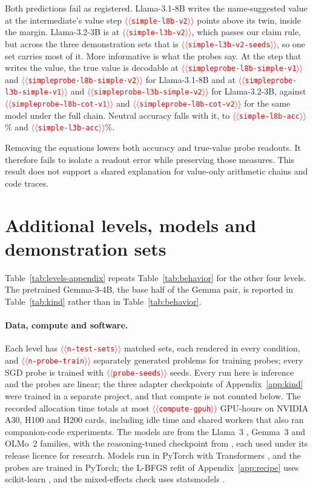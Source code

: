 \documentclass[11pt]{article}
\providecommand{\NUM}[1]{\textcolor{red}{$\langle\langle$\texttt{#1}$\rangle\rangle$}}
\begin{document}
Both predictions fail as registered. Llama-3.1-8B writes the name-suggested value at the intermediate's value
step \NUM{simple-l8b-v2} points above its twin, inside the margin. Llama-3.2-3B is at
\NUM{simple-l3b-v2}, which passes our claim rule, but across the three demonstration sets that
is \NUM{simple-l3b-v2-seeds}, so one set carries most of it. More informative is what the probes say. At
the step that writes the value, the true value is decodable at \NUM{simpleprobe-l8b-simple-v1}
and \NUM{simpleprobe-l8b-simple-v2} for Llama-3.1-8B and at
\NUM{simpleprobe-l3b-simple-v1} and \NUM{simpleprobe-l3b-simple-v2} for Llama-3.2-3B, against
\NUM{simpleprobe-l8b-cot-v1} and \NUM{simpleprobe-l8b-cot-v2} for the same model under the full
chain. Neutral accuracy falls with it, to \NUM{simple-l8b-acc}\% and \NUM{simple-l3b-acc}\%.

Removing the equations lowers both accuracy and true-value probe readouts. It therefore fails to isolate a readout error while preserving those measures. This result does not support a shared explanation for value-only arithmetic chains and code traces.

\section{Additional levels, models and demonstration sets}
Table~\ref{tab:levels-appendix} repeats Table~\ref{tab:behavior} for the other four levels.
The pretrained Gemma-3-4B, the base half of the Gemma pair, is reported in
Table~\ref{tab:kind} rather than in Table~\ref{tab:behavior}.

\paragraph{Data, compute and software.} Each level has \NUM{n-test-sets} matched sets, each
rendered in every condition, and \NUM{n-probe-train} separately generated problems for
training probes; every SGD probe is trained with \NUM{probe-seeds} seeds. Every run here is
inference and the probes are linear; the three adapter checkpoints of Appendix~\ref{app:kind}
were trained in a separate project, and that compute is not counted below. The recorded allocation time totals at most \NUM{compute-gpuh} GPU-hours on NVIDIA A30, H100 and H200 cards, including idle time and shared workers that also ran companion-code experiments.
The models are from the Llama~3 \citep{grattafiori2024llama3}, Gemma~3 \citep{gemmateam2025gemma3}
and OLMo~2 \citep{olmo2024olmo2} families, with the reasoning-tuned checkpoint from
\citet{bercovich2025nemotron}, each used under its release licence for research. Models run in
PyTorch \citep{paszke2019pytorch} with Transformers \citep{wolf2020transformers}, and the probes are
trained in PyTorch; the L-BFGS refit of Appendix~\ref{app:recipe} uses scikit-learn
\citep{pedregosa2011sklearn}, and the mixed-effects check uses statsmodels
\citep{seabold2010statsmodels}.
\end{document}
